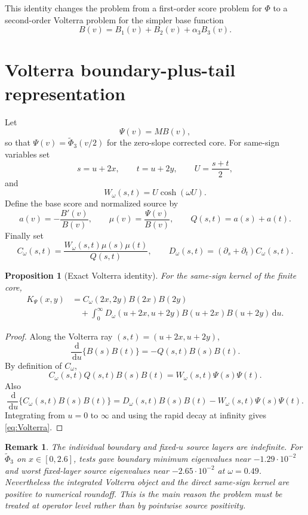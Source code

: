 \documentclass[11pt]{article}
\newtheorem{proposition}[theorem]{Proposition}
\newtheorem{remark}[theorem]{Remark}
\newcommand{\dd}{\,\mathrm d}
\begin{document}
This identity changes the problem from a first-order score problem for
$\Phi$ to a second-order Volterra problem for the simpler base function
\[
   B(v)=B_1(v)+B_2(v)+\alpha_3B_3(v).
\]

\section{Volterra boundary-plus-tail representation}

Let
\[
   \Psi(v)=MB(v),
\]
so that $\Psi(v)=\widetilde\Phi_3(v/2)$ for the zero-slope corrected core.
For same-sign variables set
\[
   s=u+2x,\qquad t=u+2y,\qquad U=\frac{s+t}{2},
\]
and
\[
   W_\omega(s,t)=U\cosh(\omega U).
\]
Define the base score and normalized source by
\[
   a(v)=-\frac{B'(v)}{B(v)},\qquad
   \mu(v)=\frac{\Psi(v)}{B(v)},\qquad
   Q(s,t)=a(s)+a(t).
\]
Finally set
\begin{equation}
   C_\omega(s,t)
   =
   \frac{W_\omega(s,t)\mu(s)\mu(t)}{Q(s,t)},
   \qquad
   D_\omega(s,t)
   =
   (\partial_s+\partial_t)C_\omega(s,t).
   \label{eq:CD}
\end{equation}

\begin{proposition}[Exact Volterra identity]
For the same-sign kernel of the finite core,
\begin{equation}
\begin{aligned}
 K_\Psi(x,y)
 &=
 C_\omega(2x,2y)B(2x)B(2y)
 \\
 &\quad+
 \int_0^\infty
 D_\omega(u+2x,u+2y)
 B(u+2x)B(u+2y)\dd u.
\end{aligned}
\label{eq:Volterra}
\end{equation}
\end{proposition}

\begin{proof}
Along the Volterra ray $(s,t)=(u+2x,u+2y)$,
\[
   \frac{\dd}{\dd u}\{B(s)B(t)\}
   =
   -Q(s,t)B(s)B(t).
\]
By definition of $C_\omega$,
\[
   C_\omega(s,t)Q(s,t)B(s)B(t)
   =
   W_\omega(s,t)\Psi(s)\Psi(t).
\]
Also
\[
   \frac{\dd}{\dd u}
   \{C_\omega(s,t)B(s)B(t)\}
   =
   D_\omega(s,t)B(s)B(t)
   -
   W_\omega(s,t)\Psi(s)\Psi(t).
\]
Integrating from $u=0$ to $\infty$ and using the rapid decay at infinity gives
\eqref{eq:Volterra}.
\end{proof}

\begin{remark}
The individual boundary and fixed-$u$ source layers are indefinite.  For
$\widetilde\Phi_3$ on $x\in[0,2.6]$, tests gave boundary minimum eigenvalues
near $-1.29\cdot 10^{-2}$ and worst fixed-layer source eigenvalues near
$-2.65\cdot 10^{-2}$ at $\omega=0.49$.  Nevertheless the integrated Volterra
object and the direct same-sign kernel are positive to numerical roundoff.
This is the main reason the problem must be treated at operator level rather
than by pointwise source positivity.
\end{remark}
\end{document}
